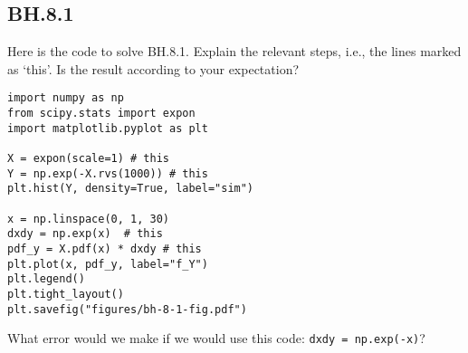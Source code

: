 

\subsection{BH.8.1}
\label{sec:bh-8.1}

\begin{exercise}
Here is the code to solve BH.8.1. Explain the relevant steps, i.e., the lines marked as `this'. Is the result according to your expectation?
\begin{verbatim}
import numpy as np
from scipy.stats import expon
import matplotlib.pyplot as plt

X = expon(scale=1) # this
Y = np.exp(-X.rvs(1000)) # this
plt.hist(Y, density=True, label="sim")

x = np.linspace(0, 1, 30)
dxdy = np.exp(x)  # this
pdf_y = X.pdf(x) * dxdy # this
plt.plot(x, pdf_y, label="f_Y")
plt.legend()
plt.tight_layout()
plt.savefig("figures/bh-8-1-fig.pdf")
\end{verbatim}
\end{exercise}

\begin{exercise}
What error would we make if we would use this code: \verb|dxdy = np.exp(-x)|?
\end{exercise}



